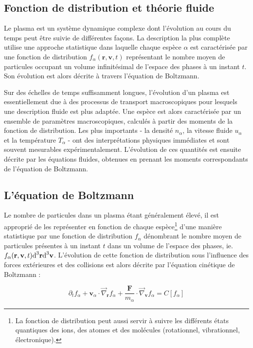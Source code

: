 \begin{refsection}
\section{Fonction de distribution et théorie fluide}
\label{Maxwell-Boltzmann}

Le plasma est un système dynamique complexe dont l'évolution au cours du temps
peut être suivie de différentes façons. La description la plus complète utilise
une approche statistique dans laquelle chaque espèce $\alpha$ est caractérisée
par une fonction de distribution $f_\alpha(\mathbf{r},\mathbf{v},t)$
représentant le nombre moyen de particules occupant un volume infinitésimal
de l'espace des phases à un instant $t$. Son évolution est alors décrite à
travers l'équation de Boltzmann.

Sur des échelles de temps suffisamment longues, l'évolution d'un plasma est 
essentiellement due à des processus de transport macroscopiques pour lesquels
une description fluide est plus adaptée. Une espèce est alors
caractérisée par un ensemble de paramètres macroscopiques, calculés à
partir des moments de la fonction de distribution. Les plus importants -
la densité $n_\alpha$, la vitesse fluide $u_\alpha$ et la température $T_\alpha$
- ont des interprétations physiques immédiates et sont souvent mesurables
expérimentalement. L'évolution de ces quantités est ensuite décrite par les
équations fluides, obtenues en prenant les moments correspondants de l'équation de Boltzmann.

\subsection{L'équation de Boltzmann}
Le nombre de particules dans un plasma étant généralement élevé, il est
approprié de les représenter en fonction de chaque
espèce\footnote{La fonction de
distribution peut aussi servir à suivre les différents états quantiques des
ions, des atomes et des molécules (rotationnel, vibrationnel, électronique).}
d'une manière statistique par une fonction de
distribution $f_\alpha$ dénombrant le nombre moyen de particules présentes à un
instant $t$ dans un volume de l'espace des phases, ie. $f_\alpha(\mathbf
r,\mathbf v,t)\text{d}^{{3}}\mathbf r\text{d}^{{3}}\mathbf v$.
L'évolution de cette fonction de distribution sous l'influence des forces
extérieures et des collisions est alors décrite par l'équation cinétique de
Boltzmann :

\begin{equation}
\label{1-BoltzmannEquation}
\partial_tf_\alpha+\mathbf{v}_\alpha\cdot\vec\nabla_\mathbf{r}f_\alpha+
\frac{\mathbf{F}}{m_\alpha}\cdot\vec\nabla_{\mathbf{v}}f_\alpha
=C[f_\alpha]
\end{equation}


\end{refsection}
